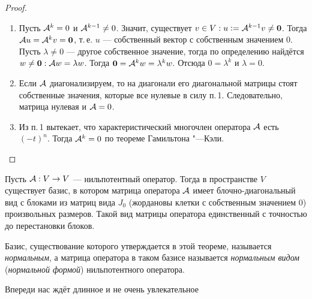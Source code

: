 \begin{proof}
    \begin{enumerate}
        \item Пусть $\mathcal{A}^k = 0$ и $\mathcal{A}^{k - 1} \ne 0$. Значит, существует $v \in V: u \vcentcolon = \mathcal{A}^{k - 1}v \ne \boldsymbol{0}$. Тогда $\mathcal{A} u = \mathcal{A}^kv = \boldsymbol{0}$, т.\,е. $u$ --- собственный вектор с собственным значением $0$. Пусть $\lambda \ne 0$ --- другое собственное значение, тогда по определению найдётся $w \ne \boldsymbol{0}: \mathcal{A} w = \lambda w$. Тогда $\boldsymbol{0} = \mathcal{A}^kw = \lambda^kw$. Отсюда $0 = \lambda^k$ и $\lambda = 0$.
        \item Если $\mathcal{A}$ диагонализируем, то на диагонали его диагональной матрицы стоят собственные значения, которые все нулевые в силу п.\,1. Следовательно, матрица нулевая и $\mathcal{A} = 0$.
        \item Из п.\,1 вытекает, что характеристический многочлен оператора $\mathcal{A}$ есть $(-t)^n$. Тогда $\mathcal{A}^k = 0$ по теореме Гамильтона "---Кэли.
    \end{enumerate}
\end{proof}

\begin{theorem}
    Пусть $\mathcal{A}: V \to V$ --- нильпотентный оператор. Тогда в пространстве $V$ существует базис, в котором матрица оператора $\mathcal{A}$ имеет блочно-диагональный вид с блоками из матриц вида $J_0$ (жордановы клетки с собственным значением $0$) произвольных размеров. Такой вид матрицы оператора единственный с точностью до перестановки блоков.
\end{theorem}

\begin{definition}
    Базис, существование которого утверждается в этой теореме, называется \textit{нормальным}, а матрица оператора в таком базисе называется \textit{нормальным видом} (\textit{нормальной формой}) нильпотентного оператора.
\end{definition}

Впереди нас ждёт длинное и не очень увлекательное

